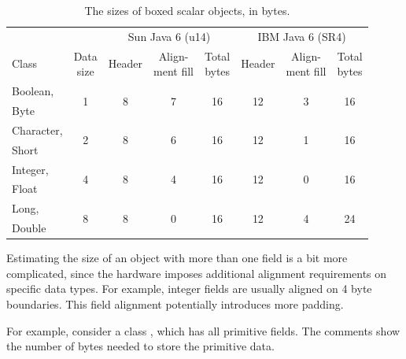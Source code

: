 \begin{table}
  \centering
	\begin{tabular}{lccccccc} \toprule
    	& & \multicolumn{3}{c}{Sun Java 6 (u14)} & \multicolumn{3}{c}{IBM Java 6
    	(SR4)} \\ \cmidrule(r){3-5} \cmidrule(l){6-8}
    	Class & \shortstack[c]{Data\\size} & Header & \shortstack{Align-\\ment
    	fill} & \shortstack[c]{Total\\bytes} & Header & \shortstack{Align-\\ment
    	fill} & \shortstack[c]{Total\\bytes}
    	\\ \midrule 
    	{Boolean,} & \multirow{2}{*}{1} & \multirow{2}{*}{8} & \multirow{2}{*}{7} &
    	\multirow{2}{*}{16} & \multirow{2}{*}{12} & \multirow{2}{*}{3} &
    	\multirow{2}{*}{16}
    	\\
    	Byte & \\ \addlinespace
    	Character, & \multirow{2}{*}{2} & \multirow{2}{*}{8} & \multirow{2}{*}{6}
    	& \multirow{2}{*}{16} & \multirow{2}{*}{12} & \multirow{2}{*}{1} &
    	\multirow{2}{*}{16} \\
    	Short & \\ \addlinespace
    	Integer, & \multirow{2}{*}{4} & \multirow{2}{*}{8} & \multirow{2}{*}{4} &
    	\multirow{2}{*}{16} & \multirow{2}{*}{12} & \multirow{2}{*}{0} &
    	\multirow{2}{*}{16}
    	\\
    	Float & \\ \addlinespace
    	Long, & \multirow{2}{*}{8} & \multirow{2}{*}{8} & \multirow{2}{*}{0} &
    	\multirow{2}{*}{16} & \multirow{2}{*}{12} & \multirow{2}{*}{4} &
    	\multirow{2}{*}{24} \\
    	Double & \\
		\bottomrule
	\end{tabular}
  \caption{The sizes of boxed scalar objects, in bytes.}
  \label{tab:boxed-scalar-sizes}
\end{table}
 
Estimating the size of an object with more than one field is a bit more complicated, since the hardware imposes additional alignment requirements on specific data types. For example, integer fields are usually aligned on 4 byte boundaries. This field alignment potentially introduces more padding.

For example, consider a class , which has all primitive fields. The comments show the number of bytes needed to store the primitive data.

